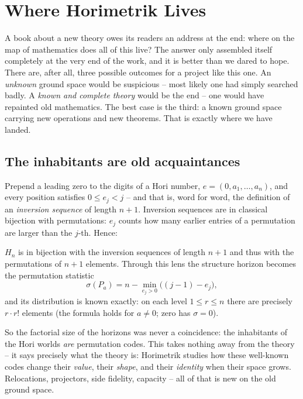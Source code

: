 \chapter{Where Horimetrik Lives}
\label{ch:einordnung}


A book about a new theory owes its readers an address at the end:
where on the map of mathematics does all of this live? The answer
only assembled itself completely at the very end of the work, and
it is better than we dared to hope. There are, after all, three
possible outcomes for a project like this one. An \emph{unknown}
ground space would be suspicious -- most likely one had simply
searched badly. A \emph{known and complete theory} would be the
end -- one would have repainted old mathematics. The best case is
the third: a known ground space carrying new operations and new
theorems. That is exactly where we have landed.

\section{The inhabitants are old acquaintances}

Prepend a leading zero to the digits of a Hori number,
$e=(0,a_1,\ldots,a_n)$, and every position satisfies $0\le e_j<j$
-- and that is, word for word, the definition of an
\emph{inversion sequence} of length $n{+}1$. Inversion sequences
are in classical bijection with permutations: $e_j$ counts how
many earlier entries of a permutation are larger than the $j$-th.
Hence:

\begin{satz}[Register S44]
$H_n$ is in bijection with the inversion sequences of length
$n{+}1$ and thus with the permutations of $n{+}1$ elements.
Through this lens the structure horizon becomes the permutation
statistic
\[
\sigma(P_a)=n-\min_{e_j>0}\bigl((j{-}1)-e_j\bigr),
\]
and its distribution is known exactly: on each level $1\le r\le n$
there are precisely $r\cdot r!$ elements (the formula holds for
$a\ne0$; zero has $\sigma=0$).
\end{satz}

So the factorial size of the horizons was never a coincidence: the
inhabitants of the Hori worlds \emph{are} permutation codes. This
takes nothing away from the theory -- it says precisely what the
theory is: Horimetrik studies how these well-known codes change
their \emph{value}, their \emph{shape}, and their \emph{identity}
when their space grows. Relocations, projectors, side fidelity,
capacity -- all of that is new on the old ground space.

